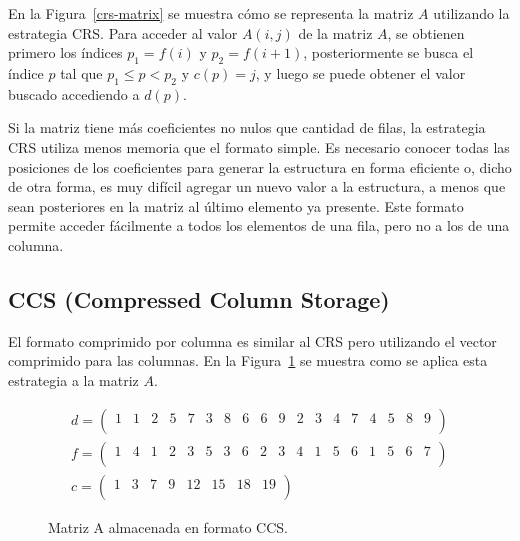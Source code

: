 En la Figura~\ref{crs-matrix} se muestra cómo se representa la matriz $A$ utilizando la estrategia CRS.
Para acceder al valor $A(i,j)$ de la matriz $A$, se obtienen primero los \'indices $p_1=f(i)$ y $p_2=f(i+1)$, posteriormente se busca el \'indice $p$ tal que $p_1 \leq p < p_2$ y $c(p) = j$, y luego se puede obtener el valor buscado accediendo a $d(p)$. 
 
 Si la matriz tiene más coeficientes no nulos que cantidad de filas, la estrategia CRS utiliza menos memoria que el formato simple. Es necesario conocer todas las posiciones de los coeficientes para generar la estructura en forma eficiente o, dicho de otra forma, es muy difícil agregar un nuevo valor a la estructura, a menos que sean posteriores en la matriz al último elemento ya presente. Este formato permite acceder fácilmente a todos los elementos de una fila, pero no a los de una columna.


\subsection{CCS (Compressed Column Storage)}

 El formato comprimido por columna es similar al CRS pero utilizando el vector comprimido para las columnas.
En la Figura~\ref{ccs-matrix} se muestra como se aplica esta estrategia a la matriz $A$.

\begin{figure}[h]
\begin{center}
\begin{eqnarray*}
d = \left(
\begin{array}{cccccccccccccccccc}
1 & 1 & 2 & 5 & 7 & 3 & 8 & 6 & 6 & 9 & 2 & 3 & 4 & 7 & 4 & 5 & 8 & 9\\
\end{array}
\right)\nonumber\\
f = \left(
\begin{array}{cccccccccccccccccc}
1 & 4 & 1 & 2 & 3 & 5 & 3 & 6 & 2 & 3 & 4 & 1 & 5 & 6 & 1 & 5 & 6 & 7\\
\end{array}
\right)\\
c = \left(
\begin{array}{cccccccc}
1 & 3 & 7 & 9 & 12 & 15 & 18 & 19\\
\end{array}
\right)\nonumber
\end{eqnarray*}
\end{center}
\caption{Matriz A almacenada en formato CCS.}
\label{ccs-matrix}
\end{figure}

